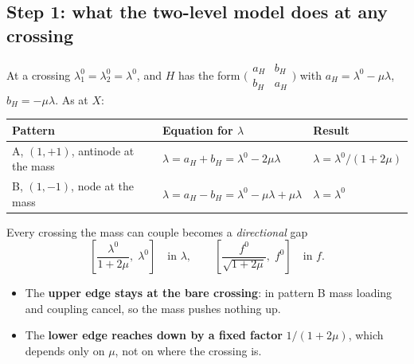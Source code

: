 \subsection{Step 1: what the two-level model does at any crossing}
At a crossing $\lambda_1^0 = \lambda_2^0 = \lambda^0$, and $H$ has the form
$\bigl(\begin{smallmatrix} a_H & b_H \\ b_H & a_H \end{smallmatrix}\bigr)$
with $a_H = \lambda^0 - \mu\lambda$, $b_H = -\mu\lambda$. As at $X$:
\begin{center}
\begin{tabular}{|l|l|l|}
\hline
Pattern & Equation for $\lambda$ & Result \\
\hline
A, $(1,+1)$, antinode at the mass & $\lambda = a_H + b_H = \lambda^0 - 2\mu\lambda$ & $\lambda = \lambda^0/(1+2\mu)$ \\
B, $(1,-1)$, node at the mass & $\lambda = a_H - b_H = \lambda^0 - \mu\lambda + \mu\lambda$ & $\lambda = \lambda^0$ \\
\hline
\end{tabular}
\end{center}
Every crossing the mass can couple becomes a \emph{directional} gap
\begin{equation}
  \left[\frac{\lambda^0}{1+2\mu},\; \lambda^0\right]
  \quad\text{in } \lambda, \qquad
  \left[\frac{f^0}{\sqrt{1+2\mu}},\; f^0\right]
  \quad\text{in } f .
\end{equation}
\begin{itemize}
  \item The \textbf{upper edge stays at the bare crossing}: in pattern B mass
        loading and coupling cancel, so the mass pushes nothing up.
  \item The \textbf{lower edge reaches down by a fixed factor}
        $1/(1+2\mu)$, which depends only on $\mu$, not on where the crossing is.
\end{itemize}

